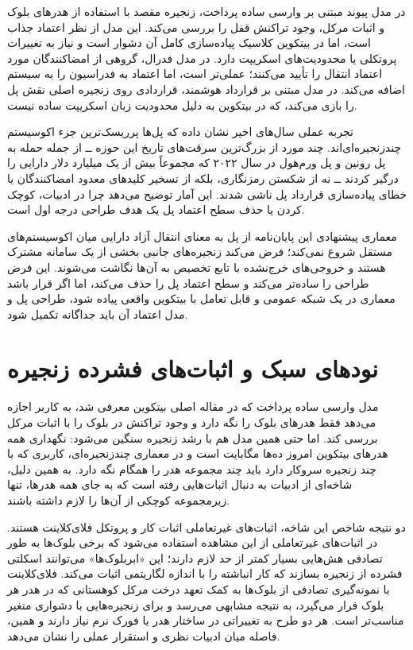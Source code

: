 در مدل پیوند مبتنی بر وارسی ساده پرداخت، زنجیره مقصد با استفاده از هدرهای بلوک و اثبات مرکل، وجود تراکنش قفل را بررسی می‌کند. این مدل از نظر اعتماد جذاب است، اما در بیتکوین کلاسیک پیاده‌سازی کامل آن دشوار است و نیاز به تغییرات پروتکلی یا محدودیت‌های اسکریپت دارد. در مدل فدرال، گروهی از امضاکنندگان مورد اعتماد انتقال را تأیید می‌کنند؛ عملی‌تر است، اما اعتماد به فدراسیون را به سیستم اضافه می‌کند. در مدل مبتنی بر قرارداد هوشمند، قراردادی روی زنجیره اصلی نقش پل را بازی می‌کند، که در بیتکوین به دلیل محدودیت زبان اسکریپت ساده نیست.

تجربه عملی سال‌های اخیر نشان داده که پل‌ها پرریسک‌ترین جزء اکوسیستم چندزنجیره‌ای‌اند. چند مورد از بزرگ‌ترین سرقت‌های تاریخ این حوزه ــ از جمله حمله به پل رونین و پل ورم‌هول در سال ۲۰۲۲ که مجموعاً بیش از یک میلیارد دلار دارایی را درگیر کردند ــ نه از شکستن رمزنگاری، بلکه از تسخیر کلیدهای معدود امضاکنندگان یا خطای پیاده‌سازی قرارداد پل ناشی شدند. این آمار توضیح می‌دهد چرا در ادبیات، کوچک کردن یا حذف سطح اعتماد پل یک هدف طراحی درجه اول است.

معماری پیشنهادی این پایان‌نامه از پل به معنای انتقال آزاد دارایی میان اکوسیستم‌های مستقل شروع نمی‌کند؛ فرض می‌کند زنجیره‌های جانبی بخشی از یک سامانه مشترک هستند و خروجی‌های خرج‌نشده با تابع تخصیص به آن‌ها نگاشت می‌شوند. این فرض طراحی را ساده‌تر می‌کند و سطح اعتماد پل را حذف می‌کند، اما اگر قرار باشد معماری در یک شبکه عمومی و قابل تعامل با بیتکوین واقعی پیاده شود، طراحی پل و مدل اعتماد آن باید جداگانه تکمیل شود.

\section{نودهای سبک و اثبات‌های فشرده زنجیره}

مدل وارسی ساده پرداخت که در مقاله اصلی بیتکوین معرفی شد، به کاربر اجازه می‌دهد فقط هدرهای بلوک را نگه دارد و وجود تراکنش در بلوک را با اثبات مرکل بررسی کند. اما حتی همین مدل هم با رشد زنجیره سنگین می‌شود: نگهداری همه هدرهای بیتکوین امروز ده‌ها مگابایت است و در معماری چندزنجیره‌ای، کاربری که با چند زنجیره سروکار دارد باید چند مجموعه هدر را همگام نگه دارد. به همین دلیل، شاخه‌ای از ادبیات به دنبال اثبات‌هایی رفته است که به جای همه هدرها، تنها زیرمجموعه کوچکی از آن‌ها را لازم داشته باشند.

دو نتیجه شاخص این شاخه، اثبات‌های غیرتعاملی اثبات کار و پروتکل فلای‌کلاینت هستند. در اثبات‌های غیرتعاملی از این مشاهده استفاده می‌شود که برخی بلوک‌ها به طور تصادفی هش‌هایی بسیار کمتر از حد لازم دارند؛ این «ابربلوک‌ها» می‌توانند اسکلتی فشرده از زنجیره بسازند که کار انباشته را با اندازه لگاریتمی اثبات می‌کند. فلای‌کلاینت با نمونه‌گیری تصادفی از بلوک‌ها به کمک تعهد درخت مرکل کوهستانی که در هدر هر بلوک قرار می‌گیرد، به نتیجه مشابهی می‌رسد و برای زنجیره‌هایی با دشواری متغیر مناسب‌تر است. هر دو طرح به تغییراتی در ساختار هدر یا فورک نرم نیاز دارند و همین، فاصله میان ادبیات نظری و استقرار عملی را نشان می‌دهد.

